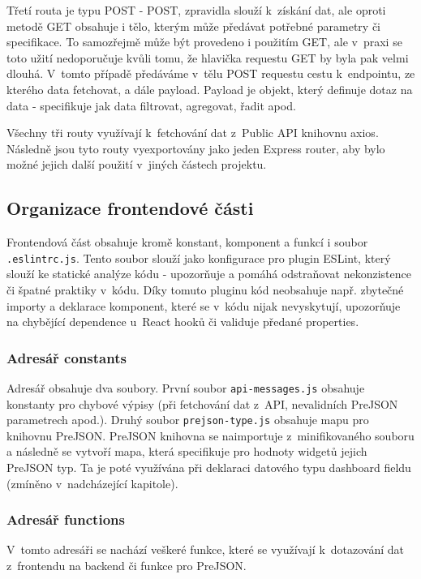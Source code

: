 \documentclass[czech, bc, kiv, he, iso690numb, viewonly]{fasthesis} %
\begin{document}
Třetí routa je typu POST - POST, zpravidla slouží k~získání dat, ale oproti metodě GET obsahuje i tělo, kterým může předávat potřebné parametry či specifikace. To samozřejmě může být provedeno i
použitím GET, ale v~praxi se toto užití nedoporučuje kvůli tomu, že hlavička requestu GET by byla pak velmi dlouhá. V~tomto případě předáváme v~tělu POST requestu cestu k~endpointu, ze kterého data
fetchovat, a dále payload. Payload je objekt, který definuje dotaz na data - specifikuje jak data filtrovat, agregovat, řadit apod. 

Všechny tři routy využívají k~fetchování dat z~Public API knihovnu axios. Následně jsou tyto routy vyexportovány jako jeden Express router, aby bylo možné jejich další použití v~jiných částech projektu.

\subsection{Organizace frontendové části}

Frontendová část obsahuje kromě konstant, komponent a funkcí i soubor \texttt{.eslintrc.js}. Tento soubor slouží jako konfigurace pro plugin ESLint, který slouží ke statické analýze
kódu - upozorňuje a pomáhá odstraňovat nekonzistence či špatné praktiky v~kódu. Díky tomuto pluginu kód neobsahuje např. zbytečné importy a deklarace komponent, které se v~kódu nijak nevyskytují,
upozorňuje na chybějící dependence u~React hooků či validuje předané properties.

\subsubsection{Adresář constants}

Adresář obsahuje dva soubory. První soubor \texttt{api-messages.js} obsahuje konstanty pro chybové výpisy (při fetchování dat z~API, nevalidních PreJSON parametrech apod.).
Druhý soubor \texttt{prejson-type.js} obsahuje mapu pro knihovnu PreJSON. PreJSON knihovna se naimportuje z~minifikovaného souboru a následně se vytvoří mapa, která specifikuje
pro hodnoty widgetů jejich PreJSON typ. Ta je poté využívána při deklaraci datového typu dashboard fieldu (zmíněno v~nadcházející kapitole).

\subsubsection{Adresář functions}

V~tomto adresáři se nachází veškeré funkce, které se využívají k~dotazování dat z~frontendu na backend či funkce pro PreJSON.
\end{document}
